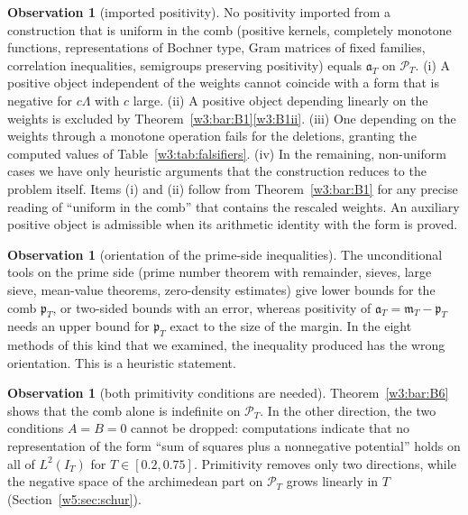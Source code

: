 \documentclass[11pt]{amsart}
\theoremstyle{definition}
\newtheorem{observation}[theorem]{Observation}
\theoremstyle{remark}
\numberwithin{equation}{section}
\newcommand{\IT}{I_T}                                  %
\newcommand{\PT}{\mathcal{P}_T}                        %
\newcommand{\mT}{\mathfrak{m}_T}                       %
\newcommand{\pT}{\mathfrak{p}_T}                       %
\newcommand{\aT}{\mathfrak{a}_T}                       %
\begin{document}
\begin{observation}[imported positivity]\label{w3:bar:B10}
No positivity imported from a construction that is uniform in the comb (positive kernels, completely monotone
functions, representations of Bochner type, Gram matrices of fixed families, correlation inequalities, semigroups
preserving positivity) equals $\aT$ on $\PT$. (i) A positive object independent of the weights cannot coincide with
a form that is negative for $c\Lambda$ with $c$ large. (ii) A positive object depending linearly on the weights is
excluded by Theorem~\ref{w3:bar:B1}\ref{w3:B1ii}. (iii) One depending on the weights through a monotone operation
fails for the deletions, granting the computed values of Table~\ref{w3:tab:falsifiers}. (iv) In the remaining,
non-uniform cases we have only heuristic arguments that the construction reduces to the problem itself. Items (i)
and (ii) follow from Theorem~\ref{w3:bar:B1} for any precise reading of ``uniform in the comb'' that contains the
rescaled weights. An auxiliary positive object is admissible when its arithmetic identity with the form is proved.
\end{observation}

\begin{observation}[orientation of the prime-side inequalities]\label{w3:bar:B12}
The unconditional tools on the prime side (prime number theorem with remainder, sieves, large sieve, mean-value
theorems, zero-density estimates) give lower bounds for the comb $\pT$, or two-sided bounds with an error, whereas
positivity of $\aT=\mT-\pT$ needs an upper bound for $\pT$ exact to the size of the margin. In the eight methods of
this kind that we examined, the inequality produced has the wrong orientation. This is a heuristic statement.
\end{observation}

\begin{observation}[both primitivity conditions are needed]\label{w3:bar:B6b}
Theorem~\ref{w3:bar:B6} shows that the comb alone is indefinite on $\PT$. In the other direction, the two
conditions $A=B=0$ cannot be dropped: computations indicate that no representation of the form ``sum of squares
plus a nonnegative potential'' holds on all of $L^2(\IT)$ for $T\in[0.2,0.75]$. Primitivity removes only two
directions, while the negative space of the archimedean part on $\PT$ grows linearly in $T$
(Section~\ref{w5:sec:schur}).
\end{observation}
\end{document}
